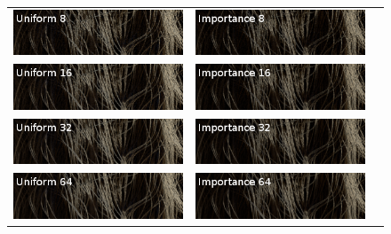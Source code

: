 \documentclass[11pt,a4paper]{report}
\begin{document}
\begin{figure}
\begin{center}
\begin{tabular}{ccc}
\includegraphics[scale=0.6]{variance-results/un8.png} & \includegraphics[scale=0.6]{variance-results/is8.png} \\
\includegraphics[scale=0.6]{variance-results/un16.png} & \includegraphics[scale=0.6]{variance-results/is16.png} \\
\includegraphics[scale=0.6]{variance-results/un32.png} & \includegraphics[scale=0.6]{variance-results/is32.png} \\
\includegraphics[scale=0.6]{variance-results/un64.png} & \includegraphics[scale=0.6]{variance-results/is64.png} \\

\end{tabular}
\end{center}
\end{figure}
\end{document}
